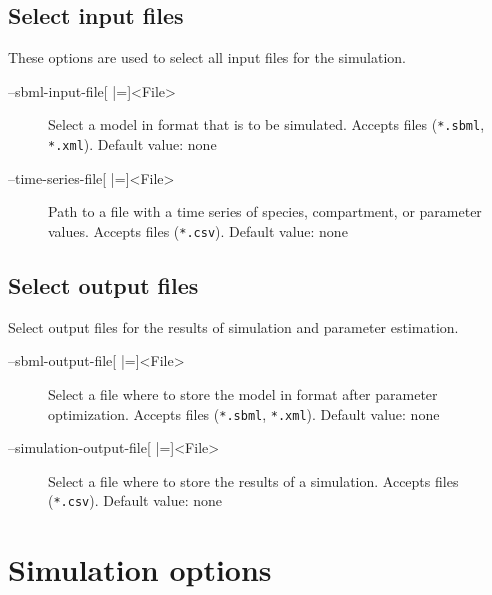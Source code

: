 \subsection{Select input files}
These options are used to select all input files for the simulation.
\begin{description}
\item[--sbml-input-file{[} |={]}<File>]
          Select a model in \SBML format that is to be simulated.
          Accepts \SBML files (\texttt{*.sbml}, \texttt{*.xml}).
          Default value: none
\item[--time-series-file{[} |={]}<File>] Path to a file with a time series of
          species, compartment, or parameter values.
          Accepts \CSV files (\texttt{*.csv}).
          Default value: none
\end{description}

\subsection{Select output files}
Select output files for the results of simulation and parameter estimation.
\begin{description}
\item[--sbml-output-file{[} |={]}<File>]
          Select a file where to store the model in \SBML format after parameter
          optimization. Accepts \SBML files (\texttt{*.sbml}, \texttt{*.xml}).
          Default value: none

\item[--simulation-output-file{[} |={]}<File>]
          Select a file where to store the results of a simulation. Accepts
          \CSV files (\texttt{*.csv}).
          Default value: none
\end{description}

\section{Simulation options}
